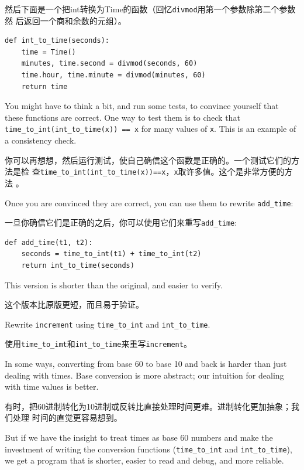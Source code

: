 \documentclass[10pt]{book}
\begin{document}
\begin{CJK}{UTF8}{gbsn}
然后下面是一个把int转换为Time的函数（回忆{\tt divmod}用第一个参数除第二个参数然
后返回一个商和余数的元组）。

\begin{verbatim}
def int_to_time(seconds):
    time = Time()
    minutes, time.second = divmod(seconds, 60)
    time.hour, time.minute = divmod(minutes, 60)
    return time
\end{verbatim}
%
You might have to think a bit, and run some tests, to convince
yourself that these functions are correct.  One way to test them is to
check that \verb"time_to_int(int_to_time(x)) == x" for many values of
{\tt x}.  This is an example of a consistency check.

你可以再想想，然后运行测试，使自己确信这个函数是正确的。一个测试它们的方法是检
查\verb"time_to_int(int_to_time(x))==x"，{\tt x}取许多值。这个是非常方便的方法
。

Once you are convinced they are correct, you can use them to 
rewrite \verb"add_time":

一旦你确信它们是正确的之后，你可以使用它们来重写\verb"add_time":

\begin{verbatim}
def add_time(t1, t2):
    seconds = time_to_int(t1) + time_to_int(t2)
    return int_to_time(seconds)
\end{verbatim}
%
This version is shorter than the original, and easier to verify.

这个版本比原版更短，而且易于验证。

\begin{exercise}

Rewrite {\tt increment} using \verb"time_to_int" and \verb"int_to_time".

使用\verb"time_to_imt"和\verb"int_to_time"来重写{\tt increment}。

\end{exercise}

In some ways, converting from base 60 to base 10 and back is harder
than just dealing with times.  Base conversion is more abstract; our
intuition for dealing with time values is better.

有时，把60进制转化为10进制或反转比直接处理时间更难。进制转化更加抽象；我们处理
时间的直觉更容易想到。

But if we have the insight to treat times as base 60 numbers and make
the investment of writing the conversion functions (\verb"time_to_int"
and \verb"int_to_time"), we get a program that is shorter, easier to
read and debug, and more reliable.


\end{CJK}
\end{document}
